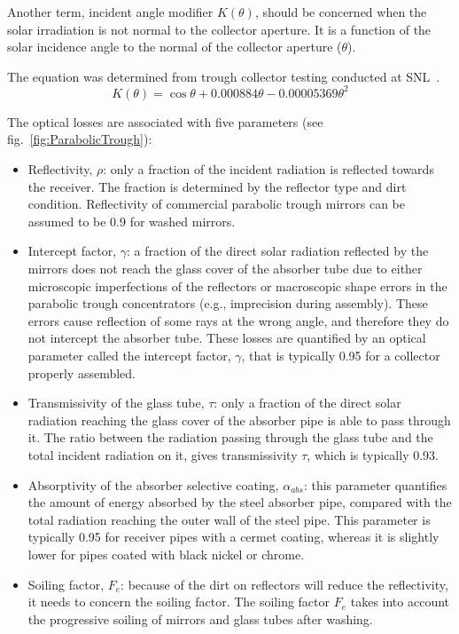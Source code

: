 Another term, incident angle modifier $K(\theta)$, should be concerned when the solar irradiation is not normal to the collector aperture. It is a function of the solar incidence angle to the normal of the collector aperture ($\theta$).

The equation was determined from trough collector testing conducted at SNL~\cite{Dudley1994}.
\begin{equation}
  K(\theta) = \cos\theta+0.000884\theta-0.00005369\theta^2
\end{equation}

The optical losses are associated with five parameters (see fig.~\ref{fig:ParabolicTrough}):

\begin{itemize}
  \item Reflectivity, $\rho$: only a fraction of the incident radiation is reflected towards the receiver. The fraction is determined by the reflector type and dirt condition. Reflectivity of commercial parabolic trough mirrors can be assumed to be 0.9 for washed mirrors. 
  \item Intercept factor, $\gamma$: a fraction of the direct solar radiation reflected by the mirrors does not reach the glass cover of the absorber tube due to either microscopic imperfections of the reflectors or macroscopic shape errors in the parabolic trough concentrators (e.g., imprecision during assembly). These errors cause reflection of some rays at the wrong angle, and therefore they do not intercept the absorber tube. These losses are quantified by an optical parameter called the intercept factor, $\gamma$, that is typically 0.95 for a collector properly assembled.
  \item Transmissivity of the glass tube, $\tau$: only a fraction of the direct solar radiation reaching the glass cover of the absorber pipe is able to pass through it. The ratio between the radiation passing through the glass tube and the total incident radiation on it, gives transmissivity $\tau$,  which is typically 0.93.
  \item Absorptivity of the absorber selective coating, $\alpha_{abs}$: this parameter quantifies the amount of energy absorbed by the steel absorber pipe, compared with the total radiation reaching the outer wall of the steel pipe. This parameter is typically 0.95 for receiver pipes with a cermet coating, whereas it is slightly lower for pipes coated with black nickel or chrome.
  \item Soiling factor, $F_e$: because of the dirt on reflectors will reduce the reflectivity, it needs to concern the soiling factor. The soiling factor $F_e$ takes into account the progressive soiling of mirrors and glass tubes after washing.
\end{itemize}

